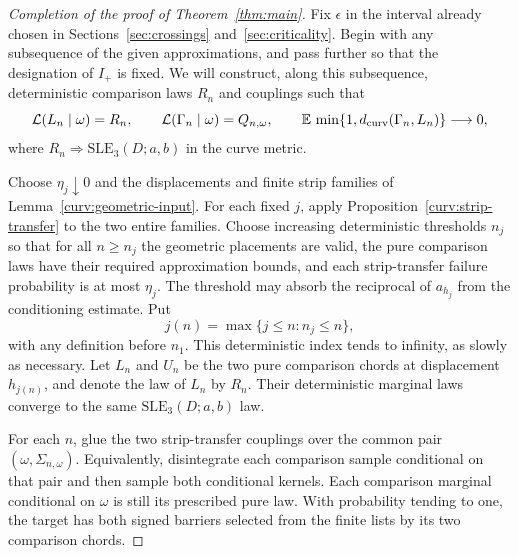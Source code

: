 \begin{proof}[Completion of the proof of Theorem~\ref{thm:main}]
Fix $\epsilon$ in the interval already chosen in
Sections~\ref{sec:crossings} and~\ref{sec:criticality}.  Begin with any
subsequence of the given approximations, and pass further so that the
designation of $I_+$ is fixed.  We will construct, along this
subsequence, deterministic comparison laws $R_n$ and couplings such
that
\begin{equation}
 \mathcal L(L_n\mid\omega)=R_n,\qquad
 \mathcal L(\Gamma_n\mid\omega)=Q_{n,\omega},\qquad
 \mathbb E\,\min\{1,d_{\mathrm{curv}}(\Gamma_n,L_n)\}\longrightarrow0,
 \label{curv:quenched-coupling}
\end{equation}
where $R_n\Longrightarrow\mathrm{SLE}_3(D;a,b)$ in the curve metric.

Choose $\eta_j\downarrow0$ and the displacements and finite strip
families of Lemma~\ref{curv:geometric-input}.  For each fixed $j$, apply
Proposition~\ref{curv:strip-transfer} to the two entire families.
Choose increasing deterministic thresholds $n_j$ so that for all
$n\ge n_j$ the geometric placements are valid, the pure comparison
laws have their required approximation bounds, and each strip-transfer
failure probability is at most $\eta_j$.  The threshold may absorb the
reciprocal of $a_{h_j}$ from the conditioning estimate.  Put
\[
 j(n)=\max\{j\le n:n_j\le n\},
\]
with any definition before $n_1$.  This deterministic index tends to
infinity, as slowly as necessary.  Let $L_n$ and $U_n$ be the two pure
comparison chords at displacement $h_{j(n)}$, and denote the law of
$L_n$ by $R_n$.  Their deterministic marginal laws converge to the
same $\mathrm{SLE}_3(D;a,b)$ law.

For each $n$, glue the two strip-transfer couplings over the common
pair $(\omega,\Sigma_{n,\omega})$.  Equivalently, disintegrate each
comparison sample conditional on that pair and then sample both
conditional kernels.  Each comparison marginal conditional on $\omega$
is still its prescribed pure law.  With probability tending to one,
the target has both signed barriers selected from the finite lists
by its two comparison chords.


\end{proof}
